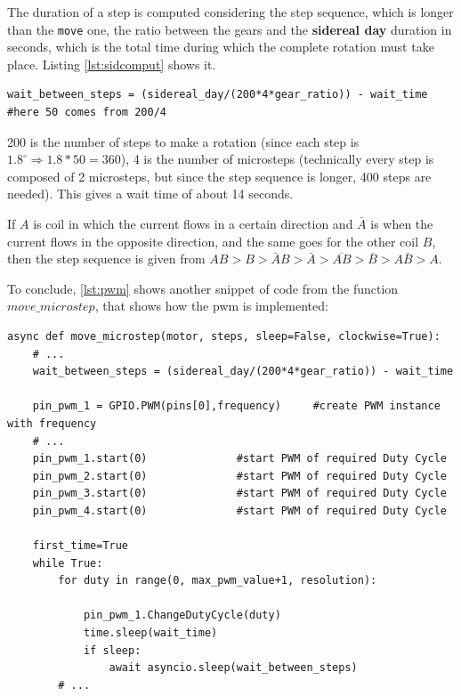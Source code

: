\documentclass[]{article}
\begin{document}
The duration of a step is computed considering the step sequence, which is longer than the \texttt{move} one, the ratio between the gears and the \textbf{sidereal day} duration in seconds, which is the total time during which the complete rotation must take place. Listing \ref{lst:sidcomput} shows it. 

\begin{lstlisting}[language=PythonPlus, label={lst:sidcomput}, caption={\texttt{move\_microstep} function, showing the computations for how much time wait between a step and another.}]
wait_between_steps = (sidereal_day/(200*4*gear_ratio)) - wait_time #here 50 comes from 200/4
\end{lstlisting}

200 is the number of steps to make a rotation (since each step is $1.8^\circ \Rightarrow 1.8*50=360$), 4 is the number of microsteps (technically every step is composed of 2 microsteps, but since the step sequence is longer, 400 steps are needed). This gives a wait time of about 14 seconds.

If $A$ is coil in which the current flows in a certain direction and $\bar{A}$ is when the current flows in the opposite direction, and the same goes for the other coil $B$, then the step sequence is given from $AB > B > \bar{A}B > \bar{A} > \overline{AB} > \bar{B} > A\bar{B} > A$. 

To conclude, \ref{lst:pwm} shows another snippet of code from the function $move\_microstep$, that shows how the pwm is implemented:

\begin{lstlisting}[language=PythonPlus, label={lst:pwm}, caption=The use of the pwm capability of the Raspberry in the \texttt{move\_microstep} function.]
async def move_microstep(motor, steps, sleep=False, clockwise=True):
	# ...
	wait_between_steps = (sidereal_day/(200*4*gear_ratio)) - wait_time 

	pin_pwm_1 = GPIO.PWM(pins[0],frequency)		#create PWM instance with frequency
	# ...
	pin_pwm_1.start(0)				#start PWM of required Duty Cycle 
	pin_pwm_2.start(0)				#start PWM of required Duty Cycle 
	pin_pwm_3.start(0)				#start PWM of required Duty Cycle 
	pin_pwm_4.start(0)				#start PWM of required Duty Cycle 

	first_time=True
	while True:
		for duty in range(0, max_pwm_value+1, resolution):
		
			pin_pwm_1.ChangeDutyCycle(duty)
			time.sleep(wait_time)
			if sleep:
				await asyncio.sleep(wait_between_steps)
		# ...
		
\end{lstlisting}
\end{document}
